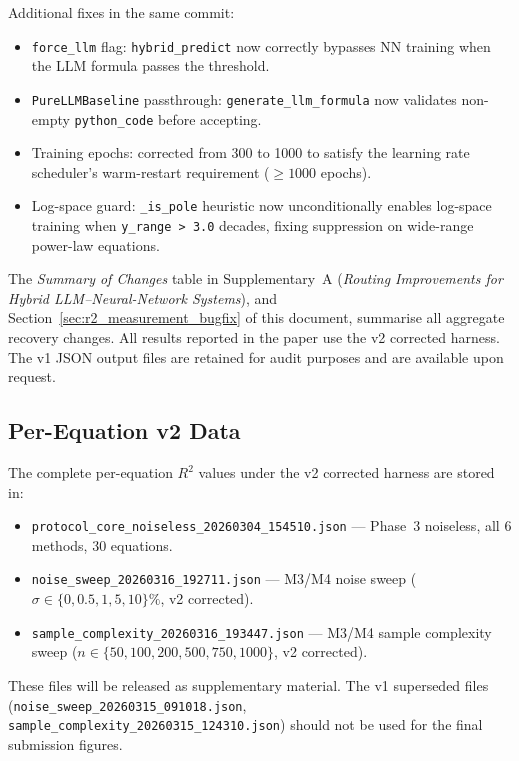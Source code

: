 \documentclass[twoside,11pt]{article}
\begin{document}
Additional fixes in the same commit:
\begin{itemize}
  \item \texttt{force\_llm} flag: \texttt{hybrid\_predict} now correctly
    bypasses NN training when the LLM formula passes the threshold.
  \item \texttt{PureLLMBaseline} passthrough: \texttt{generate\_llm\_formula}
    now validates non-empty \texttt{python\_code} before accepting.
  \item Training epochs: corrected from 300 to 1000 to satisfy the learning
    rate scheduler's warm-restart requirement ($\geq\!1000$ epochs).
  \item Log-space guard: \texttt{\_is\_pole} heuristic now unconditionally
    enables log-space training when \texttt{y\_range > 3.0} decades,
    fixing suppression on wide-range power-law equations.
\end{itemize}

The \emph{Summary of Changes} table in Supplementary~A (\emph{Routing Improvements for Hybrid LLM--Neural-Network Systems}), and Section~\ref{sec:r2_measurement_bugfix} of this document, summarise all
aggregate recovery changes. All results reported in the paper use the
v2 corrected harness. The v1 JSON output files are retained for audit
purposes and are available upon request.

\subsection*{Per-Equation v2 Data}

The complete per-equation $R^2$ values under the v2 corrected harness are
stored in:
\begin{itemize}
  \item \texttt{protocol\_core\_noiseless\_20260304\_154510.json} —
    Phase~3 noiseless, all 6 methods, 30 equations.
  \item \texttt{noise\_sweep\_20260316\_192711.json} —
    M3/M4 noise sweep ($\sigma \in \{0, 0.5, 1, 5, 10\}\%$, v2 corrected).
  \item \texttt{sample\_complexity\_20260316\_193447.json} —
    M3/M4 sample complexity sweep ($n \in \{50, 100, 200, 500, 750, 1000\}$,
    v2 corrected).
\end{itemize}
These files will be released as supplementary material. The v1 superseded
files (\texttt{noise\_sweep\_20260315\_091018.json},
\texttt{sample\_complexity\_20260315\_124310.json}) should not be used
for the final submission figures.
\end{document}
